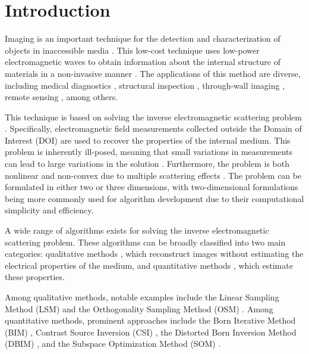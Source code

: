 \documentclass{ieeeaccess}
\begin{document}
\section{Introduction}\label{sec:introduction}

     Imaging is an important technique for the detection and characterization of objects in inaccessible media \cite{pastorino2010microwave}. This low-cost technique uses low-power electromagnetic waves to obtain information about the internal structure of materials in a non-invasive manner \cite{godinho2025evaluation}. The applications of this method are diverse, including medical diagnostics \cite{mojabi2025microwave}, structural inspection \cite{fedeli2025mild}, through-wall imaging \cite{fedeli2020through}, remote sensing \cite{salucci2017multifrequency}, among others.

    This technique is based on solving the inverse electromagnetic scattering problem \cite{chen2018computational}. Specifically, electromagnetic field measurements collected outside the Domain of Interest (DOI) are used to recover the properties of the internal medium. This problem is inherently ill-posed, meaning that small variations in measurements can lead to large variations in the solution \cite{colton2019inverse}. Furthermore, the problem is both nonlinear and non-convex due to multiple scattering effects \cite{chen2018computational}. The problem can be formulated in either two or three dimensions, with two-dimensional formulations being more commonly used for algorithm development due to their computational simplicity and efficiency.

    A wide range of algorithms exists for solving the inverse electromagnetic scattering problem. These algorithms can be broadly classified into two main categories: qualitative methods \cite{pastorino2010ch5}, which reconstruct images without estimating the electrical properties of the medium, and quantitative methods \cite{pastorino2010ch7}, which estimate these properties. 

    Among qualitative methods, notable examples include the Linear Sampling Method (LSM) \cite{chen2017lsm} and the Orthogonality Sampling Method (OSM) \cite{harris2020orthogonality}. Among quantitative methods, prominent approaches include the Born Iterative Method (BIM) \cite{wang1989iterative}, Contrast Source Inversion (CSI) \cite{berg1997contrast}, the Distorted Born Inversion Method (DBIM) \cite{chew1990reconstruction}, and the Subspace Optimization Method (SOM) \cite{chen2010subspace}.
\end{document}
